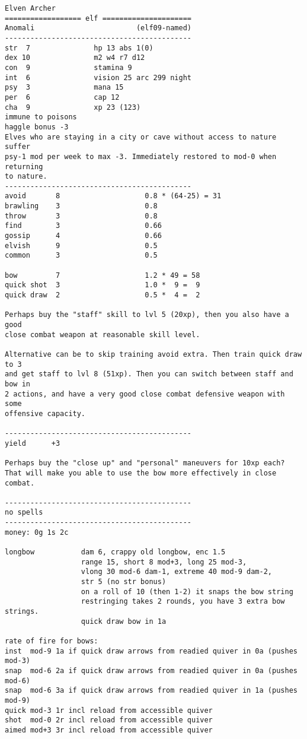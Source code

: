 \goodbreak
\tiny \begin{samepage} \begin{verbatim}
Elven Archer
================== elf =====================
Anomali                        (elf09-named)
--------------------------------------------
str  7               hp 13 abs 1(0)
dex 10               m2 w4 r7 d12
con  9               stamina 9
int  6               vision 25 arc 299 night
psy  3               mana 15
per  6               cap 12
cha  9               xp 23 (123)
immune to poisons
haggle bonus -3
Elves who are staying in a city or cave without access to nature suffer
psy-1 mod per week to max -3. Immediately restored to mod-0 when returning
to nature.
--------------------------------------------
avoid       8                    0.8 * (64-25) = 31
brawling    3                    0.8
throw       3                    0.8
find        3                    0.66
gossip      4                    0.66
elvish      9                    0.5
common      3                    0.5

bow         7                    1.2 * 49 = 58
quick shot  3                    1.0 *  9 =  9
quick draw  2                    0.5 *  4 =  2

Perhaps buy the "staff" skill to lvl 5 (20xp), then you also have a good
close combat weapon at reasonable skill level.

Alternative can be to skip training avoid extra. Then train quick draw to 3
and get staff to lvl 8 (51xp). Then you can switch between staff and bow in
2 actions, and have a very good close combat defensive weapon with some
offensive capacity.

--------------------------------------------
yield      +3

Perhaps buy the "close up" and "personal" maneuvers for 10xp each?
That will make you able to use the bow more effectively in close combat.

--------------------------------------------
no spells
--------------------------------------------
money: 0g 1s 2c

longbow           dam 6, crappy old longbow, enc 1.5
                  range 15, short 8 mod+3, long 25 mod-3,
                  vlong 30 mod-6 dam-1, extreme 40 mod-9 dam-2,
                  str 5 (no str bonus)
                  on a roll of 10 (then 1-2) it snaps the bow string
                  restringing takes 2 rounds, you have 3 extra bow strings.
                  quick draw bow in 1a

rate of fire for bows:
inst  mod-9 1a if quick draw arrows from readied quiver in 0a (pushes mod-3)
snap  mod-6 2a if quick draw arrows from readied quiver in 0a (pushes mod-6)
snap  mod-6 3a if quick draw arrows from readied quiver in 1a (pushes mod-9)
quick mod-3 1r incl reload from accessible quiver
shot  mod-0 2r incl reload from accessible quiver
aimed mod+3 3r incl reload from accessible quiver


\end{verbatim}
\end{samepage}
